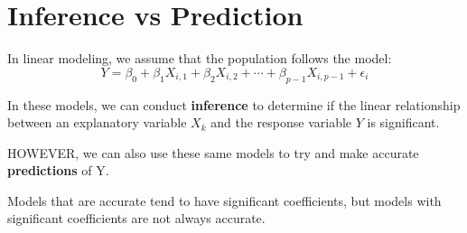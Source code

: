 \documentclass[12pt]{notes}
\begin{document}

\begin{minipage}[l][3cm][c]{\textwidth}
\begin{comment}
\note{As seen before, a practical difference is not always significant, but a significant difference is not always practical.}

\note{When sample sizes are LARGE, nearly every difference is flagged as significant, even if the actual difference between groups is small.}
\end{comment}
\end{minipage}

\section{Inference vs Prediction}
In linear modeling, we assume that the population follows the model:
\[Y = \beta_0 + \beta_1X_{i,1} + \beta_2X_{i,2} + \cdots + \beta_{p-1}X_{i, p-1} + \epsilon_i\]

\nspace
In these models, we can conduct \textbf{inference} to determine if the linear relationship between an explanatory variable $X_k$ and the response variable $Y$ is significant. 

\nspace
HOWEVER, we can also use these same models to try and make accurate \textbf{predictions} of Y. 

\nspace
Models that are accurate tend to have significant coefficients, but models with significant coefficients are not always accurate. 



\begin{minipage}[l][3cm][c]{\textwidth}
\begin{comment}
\note{Accuracy: Predicting the market value of a house given square footage, lot size, etc.}

\nspace
\note{Significance: Determining if there is a statistically significant gender bias in pay, after accounting for other demographic factors.}
\end{comment}
\end{minipage}


























\end{document}
